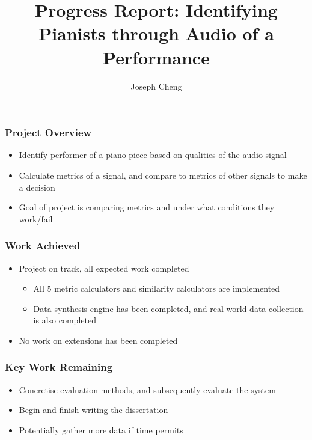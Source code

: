 \documentclass{beamer}
\title{Progress Report: Identifying Pianists through Audio of a Performance}
\author{Joseph Cheng}
\begin{document}
\begin{frame}
    \titlepage
\end{frame}

\begin{frame}
  \frametitle{Project Overview}

  \begin{itemize}
    \item
      Identify performer of a piano piece based on qualities of the audio signal
    \item
      Calculate metrics of a signal, and compare to metrics of other signals to make a decision

    \item
      Goal of project is comparing metrics and under what conditions they work/fail


  \end{itemize}

\end{frame}

\begin{frame}
  \frametitle{Work Achieved}

  \begin{itemize}

    \item
      Project on track, all expected work completed

      \begin{itemize}

      \item
        All 5 metric calculators and similarity calculators are implemented

      \item
        Data synthesis engine has been completed, and real-world data collection is also completed
            
      \end{itemize}

    \item
      No work on extensions has been completed


  \end{itemize}

\end{frame}

\begin{frame}
  \frametitle{Key Work Remaining}

  \begin{itemize}

    \item
      Concretise evaluation methods, and subsequently evaluate the system

    \item
      Begin and finish writing the dissertation

    \item
      Potentially gather more data if time permits

      
  \end{itemize}

\end{frame}
    
\end{document}
